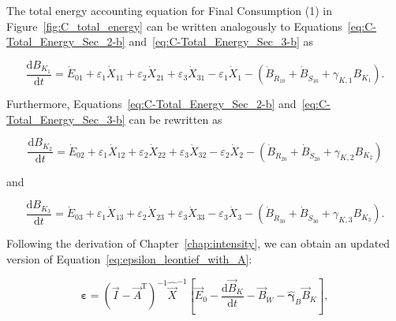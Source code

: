 The total energy accounting equation for Final Consumption (1)
in Figure~\ref{fig:C_total_energy} can be written 
analogously to Equations~\ref{eq:C-Total_Energy_Sec_2-b}
and~\ref{eq:C-Total_Energy_Sec_3-b} as

\begin{equation} \label{eq:C-Total_Energy_Sec_1-unfinished}
	\frac{\mathrm{d}B_{K_{1}}}{\mathrm{d}t}
	= \dot{E}_{01}
	+ \varepsilon_{1} \dot{X}_{11}
	+ \varepsilon_{2} \dot{X}_{21}
	+ \varepsilon_{3} \dot{X}_{31}
	- \varepsilon_{1} \dot{X}_{1}
	- \left( \dot{B}_{\dot{R}_{10}} 
							+ \dot{B}_{\dot{S}_{10}}
							+ \gamma_{K,1} B_{K_{1}}
							\right).
\end{equation}

\noindent{}Furthermore, Equations~\ref{eq:C-Total_Energy_Sec_2-b}
and~\ref{eq:C-Total_Energy_Sec_3-b}
can be rewritten as 

\begin{equation} \label{eq:C-Total_Energy_Sec_2-unfinished}
	\frac{\mathrm{d}B_{K_{2}}}{\mathrm{d}t}
	= \dot{E}_{02}
	+ \varepsilon_{1} \dot{X}_{12}
	+ \varepsilon_{2} \dot{X}_{22}
	+ \varepsilon_{3} \dot{X}_{32}
	- \varepsilon_{2} \dot{X}_{2}
	- \left( \dot{B}_{\dot{R}_{20}} 
							+ \dot{B}_{\dot{S}_{20}}
							+ \gamma_{K,2} B_{K_{2}}
							\right)
\end{equation}

\noindent{}and

\begin{equation} \label{eq:C-Total_Energy_Sec_3-unfinished}
	\frac{\mathrm{d}B_{K_{3}}}{\mathrm{d}t}
	= \dot{E}_{03}
	+ \varepsilon_{1} \dot{X}_{13}
	+ \varepsilon_{2} \dot{X}_{23}
	+ \varepsilon_{3} \dot{X}_{33}
	- \varepsilon_{3} \dot{X}_{3}
	- \left( \dot{B}_{\dot{R}_{30}} 
							+ \dot{B}_{\dot{S}_{30}}
							+ \gamma_{K,3} B_{K_{3}}
							\right).
\end{equation}

\noindent{}Following the derivation of Chapter~\ref{chap:intensity},
we can obtain an updated version 
of Equation~\ref{eq:epsilon_leontief_with_A}:

\begin{equation} \label{eq:epsilon_leontief_depreciation_simplification_demand_endogenized}
	\boldsymbol{\varepsilon} 
	= {(\vec{I} - \vec{A}^{\mathrm{T}})}^{-1}\hat{\vec{X}}^{-1}
		\left[\vec{E}_{0} 
				- \frac{\mathrm{d}\vec{B}_{K}}{\mathrm{d}t} 
				- \vec{B}_{\dot{W}}
				- \hat{\boldsymbol{\gamma}}_{B}\vec{B}_{K}
		\right],
\end{equation}

